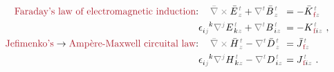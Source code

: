 \begin{subequations} \label{eq:Curl-EH}
	\abovedisplayskip=0pt
\begin{align}
	\textcolor{Maroon}{\text{Faraday's law of electromagnetic induction}}\text{:}&\hspace{1.2em} \mathcolor{gray}{\bar{\nabla} \times} \bar{E}^{\;\!\mathcolor{gray}{t}}_{\;\!\mathcolor{gray}{z}} + \mathcolor{gray}{\nabla^t} \bar{B}^{\;\!\mathcolor{gray}{t}}_{\;\!\mathcolor{gray}{z}} \hspace{-0.9em} &&= - \bar{K}^{\;\!\mathcolor{gray}{t}}_{\;\!\textcolor{Maroon}{\text{f}}\mathcolor{gray}{z}} \label{eq:Curl-EK} \\ 
	&\epsilon^{\hphantom{ij}k}_{i\mathcolor{gray}{j}} \mathcolor{gray}{\nabla^j} E^{\;\!\mathcolor{gray}{t}}_{\;\! k\mathcolor{gray}{z}} + \mathcolor{gray}{\nabla^t} B^{\;\!\mathcolor{gray}{t}}_{\;\! i\mathcolor{gray}{z}} \hspace{-0.9em} &&= - K^{\;\!\mathcolor{gray}{t}}_{\;\! \textcolor{Maroon}{\text{f}} i\mathcolor{gray}{z}}~, \label{eq:curl-EK} \\ 
	\textcolor{Maroon}{\text{Jefimenko's}} \to \textcolor{Maroon}{\text{Amp\`{e}re-Maxwell circuital law}}\text{:}&\hspace{1.2em} \mathcolor{gray}{\bar{\nabla} \times} \bar{H}^{\;\!\mathcolor{gray}{t}}_{\;\!\mathcolor{gray}{z}} - \mathcolor{gray}{\nabla^t} \bar{D}^{\;\!\mathcolor{gray}{t}}_{\;\!\mathcolor{gray}{z}} \hspace{-0.9em} &&= \bar{J}^{\;\!\mathcolor{gray}{t}}_{\;\!\textcolor{Maroon}{\text{f}}\mathcolor{gray}{z}} \label{eq:Curl-H} \\ 
	&\epsilon^{\hphantom{ij}k}_{i\mathcolor{gray}{j}} \mathcolor{gray}{\nabla^j} H^{\;\!\mathcolor{gray}{t}}_{\;\! k\mathcolor{gray}{z}} - \mathcolor{gray}{\nabla^t} D^{\;\!\mathcolor{gray}{t}}_{\;\! i\mathcolor{gray}{z}} \hspace{-0.9em} &&= J^{\;\!\mathcolor{gray}{t}}_{\;\! \textcolor{Maroon}{\text{f}} i\mathcolor{gray}{z}}~. \label{eq:curl-H}
\end{align}
\end{subequations}
